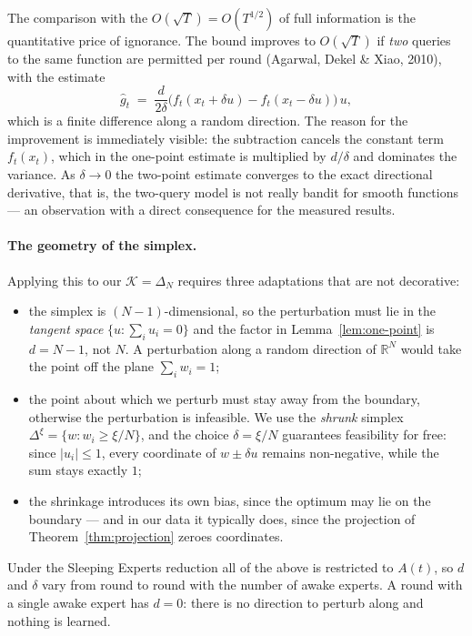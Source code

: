 \documentclass[12pt,a4paper,oneside]{report}
\renewcommand{\_}{\oldunderscore\allowbreak}
\theoremstyle{definition}
\theoremstyle{plain}
\theoremstyle{remark}
\begin{document}
The comparison with the $O(\sqrt{T}) = O(T^{1/2})$ of full information is the quantitative price
of ignorance. The bound improves to $O(\sqrt{T})$ if \emph{two} queries to the same function are
permitted per round (Agarwal, Dekel \& Xiao, 2010), with the estimate
\[
\hat{g}_t \;=\; \frac{d}{2\delta}\big( f_t(x_t + \delta u) - f_t(x_t - \delta u) \big)\, u,
\]
which is a finite difference along a random direction. The reason for the improvement is
immediately visible: the subtraction cancels the constant term $f_t(x_t)$, which in the one-point
estimate is multiplied by $d/\delta$ and dominates the variance. As $\delta \to 0$ the two-point
estimate converges to the exact directional derivative, that is, the two-query model is not
really bandit for smooth functions --- an observation with a direct consequence for the measured
results.

\paragraph{The geometry of the simplex.} Applying this to our $\mathcal{K}=\Delta_N$ requires
three adaptations that are not decorative:

\begin{itemize}
  \item the simplex is $(N\!-\!1)$-dimensional, so the perturbation must lie in the
        \emph{tangent space} $\{u : \sum_i u_i = 0\}$ and the factor in
        Lemma~\ref{lem:one-point} is $d = N-1$, not $N$. A perturbation along a random direction
        of $\mathbb{R}^N$ would take the point off the plane $\sum_i w_i = 1$;
  \item the point about which we perturb must stay away from the boundary, otherwise the
        perturbation is infeasible. We use the \emph{shrunk} simplex
        $\Delta^{\xi} = \{w : w_i \geq \xi/N\}$, and the choice $\delta = \xi/N$ guarantees
        feasibility for free: since $|u_i|\leq 1$, every coordinate of $w \pm \delta u$ remains
        non-negative, while the sum stays exactly $1$;
  \item the shrinkage introduces its own bias, since the optimum may lie on the boundary ---
        and in our data it typically does, since the projection of
        Theorem~\ref{thm:projection} zeroes coordinates.
\end{itemize}

Under the Sleeping Experts reduction all of the above is restricted to $A(t)$, so $d$ and
$\delta$ vary from round to round with the number of awake experts. A round with a single awake
expert has $d=0$: there is no direction to perturb along and nothing is learned.
\end{document}
